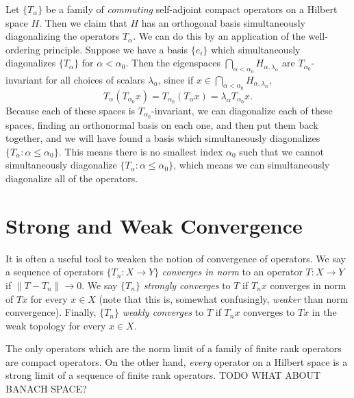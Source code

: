 \begin{remark}
    Let $\{ T_\alpha \}$ be a family of \emph{commuting} self-adjoint compact operators on a Hilbert space $H$. Then we claim that $H$ has an orthogonal basis simultaneously diagonalizing the operators $T_\alpha$. We can do this by an application of the well-ordering principle. Suppose we have a basis $\{ e_i \}$ which simultaneously diagonalizes $\{ T_\alpha \}$ for $\alpha < \alpha_0$. Then the eigenspaces $\bigcap_{\alpha < \alpha_0} H_{\alpha,\lambda_\alpha}$ are $T_{\alpha_0}$-invariant for all choices of scalars $\lambda_\alpha$, since if $x \in \bigcap_{\alpha < \alpha_0} H_{\alpha,\lambda_\alpha}$,
    \[ T_\alpha (T_{\alpha_0} x) = T_{\alpha_0} (T_\alpha x) = \lambda_\alpha T_{\alpha_0} x. \]
    Because each of these spaces is $T_{\alpha_0}$-invariant, we can diagonalize each of these spaces, finding an orthonormal basis on each one, and then put them back together, and we will have found a basis which simultaneously diagonalizes $\{ T_\alpha : \alpha \leq \alpha_0 \}$. This means there is no smallest index $\alpha_0$ such that we cannot simultaneously diagonalize $\{ T_\alpha : \alpha \leq \alpha_0 \}$, which means we can simultaneously diagonalize all of the operators.
\end{remark}










\section{Strong and Weak Convergence}

It is often a useful tool to weaken the notion of convergence of operators. We say a sequence of operators $\{ T_n: X \to Y \}$ \emph{converges in norm} to an operator $T: X \to Y$ if $\| T - T_n \| \to 0$. We say $\{ T_n \}$ \emph{strongly converges} to $T$ if $T_n x$ converges in norm of $Tx$ for every $x \in X$ (note that this is, somewhat confusingly, \emph{weaker} than norm convergence). Finally, $\{ T_n \}$ \emph{weakly converges} to $T$ if $T_n x$ converges to $Tx$ in the weak topology for every $x \in X$.

\begin{example}
    The only operators which are the norm limit of a family of finite rank operators are compact operators. On the other hand, \emph{every} operator on a Hilbert space is a strong limit of a sequence of finite rank operators. TODO WHAT ABOUT BANACH SPACE?
\end{example}

























